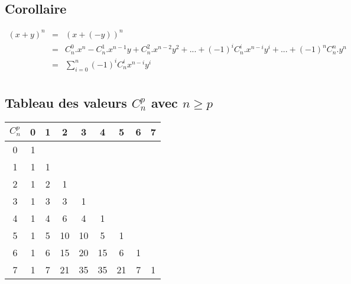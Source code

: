 \documentclass[12pt]{article}
\begin{document}
\subsection*{Corollaire}

\begin{eqnarray*}
(x+y)^n&=&(x+(-y))^n\\
&=&C_n^0.x^n-C_n^1.x^{n-1}y+C_n^2.x^{n-2}y^2+...+(-1)^iC_n^i.x^{n-i}y^i+...+(-1)^nC_n^n.y^n\\
&=&\sum_{i=0}^n(-1)^iC_n^ix^{n-i}y^i\\
\end{eqnarray*}

\subsection*{Tableau des valeurs $C_n^p$ avec $n\geq p$}

\begin{tabular}{|c||c|c|c|c|c|c|c|c|}
\hline
$C_n^p$ & 0 & 1 & 2 & 3 & 4 & 5 & 6 & 7\\ \hline \hline
0 & 1 & & & & & & &\\ \hline
1 & 1 & 1 & & & & & &\\ \hline
2 & 1 & 2 & 1 & & & & &\\ \hline
3 & 1 & 3 & 3 & 1 & & & &\\ \hline
4 & 1 & 4 & 6 & 4 & 1 & & &\\ \hline
5 & 1 & 5 & 10 & 10 & 5 & 1 & &\\ \hline
6 & 1 & 6 & 15 & 20 & 15 & 6 & 1 &\\ \hline
7 & 1 & 7 & 21 & 35 & 35 & 21 & 7 & 1\\ \hline
\end{tabular}
\end{document}
